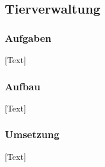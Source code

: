 
\subsection{Tierverwaltung}

\subsubsection{Aufgaben}
[Text]

\subsubsection{Aufbau}
[Text]

\subsubsection{Umsetzung}
[Text]

